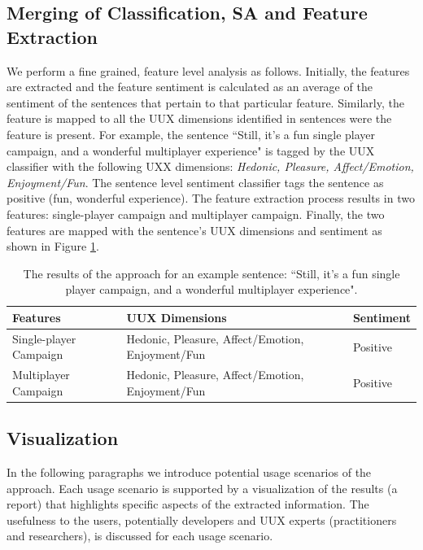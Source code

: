 \subsection{Merging of Classification, SA and Feature Extraction}


We perform a fine grained, feature level analysis as follows. Initially, the features are extracted and the feature sentiment is calculated as an average of the sentiment of the sentences that pertain to that particular feature. Similarly, the feature is mapped to all the UUX dimensions identified in sentences were the feature is present. For example, the sentence ``Still, it's a fun single player campaign, and a wonderful multiplayer experience"  is tagged by the UUX classifier with the following UXX dimensions: \textit{Hedonic, Pleasure, Affect/Emotion, Enjoyment/Fun}. The sentence level sentiment classifier tags the sentence as positive (fun, wonderful experience). The feature extraction process results in two features:  single-player campaign and multiplayer campaign. Finally, the two features are mapped with the sentence's UUX dimensions and sentiment as shown in Figure \ref{tab:example_results_approach}.

\begin{table}
\centering
\caption{The results of the approach for an example sentence: ``Still, it's a fun single player campaign, and a wonderful multiplayer experience".}
\label{tab:example_results_approach}
	\begin{tabularx}{\linewidth}{| p{4cm}|X| p{1.9cm}|}
	\hline
	\textbf{Features}&\textbf{UUX Dimensions}&\textbf{Sentiment}\\
	\hline
	Single-player Campaign&Hedonic, Pleasure, Affect/Emotion, Enjoyment/Fun&Positive\\
	\hline
	Multiplayer Campaign&Hedonic, Pleasure, Affect/Emotion, Enjoyment/Fun&Positive\\
	\hline
\end{tabularx}
\end{table}


\subsection{Visualization}

In the following paragraphs we introduce potential usage scenarios of the approach. 
Each usage scenario is supported by a visualization of the results (a report) that highlights specific aspects of the extracted information. The usefulness to the users, potentially developers and UUX experts (practitioners and researchers), is discussed for each usage scenario. 

